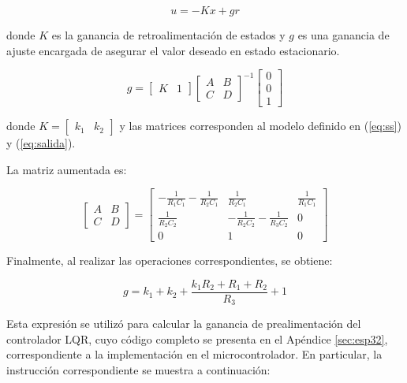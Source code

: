 \documentclass[12pt,letterpaper,twoside]{article}
\begin{document}
\begin{equation}
u = -Kx + g r
\end{equation}

donde \(K\) es la ganancia de retroalimentación de estados y \(g\) es una ganancia de ajuste encargada de asegurar el valor deseado en estado estacionario.

\begin{equation}
g =
\begin{bmatrix}
K & 1
\end{bmatrix}
\begin{bmatrix}
A & B \\
C & D
\end{bmatrix}^{-1}
\begin{bmatrix}
0 \\
0 \\
1
\end{bmatrix}
\end{equation}

donde \(K = \begin{bmatrix} k_1 & k_2 \end{bmatrix}\) y las matrices corresponden al modelo definido en (\ref{eq:ss}) y (\ref{eq:salida}).

La matriz aumentada es:

\begin{equation}
\begin{bmatrix}
A & B \\
C & D
\end{bmatrix}
=
\begin{bmatrix}
-\frac{1}{R_1 C_1} - \frac{1}{R_2 C_1} & \frac{1}{R_2 C_1} & \frac{1}{R_1 C_1} \\
\frac{1}{R_2 C_2} & -\frac{1}{R_2 C_2} - \frac{1}{R_3 C_2} & 0 \\
0 & 1 & 0
\end{bmatrix}
\end{equation}

Finalmente, al realizar las operaciones correspondientes, se obtiene:

\begin{equation}
g = k_1 + k_2 + \frac{k_1 R_2 + R_1 + R_2}{R_3} +1
\end{equation}

Esta expresión se utilizó para calcular la ganancia de prealimentación del controlador LQR, cuyo código completo se presenta en el Apéndice \ref{sec:esp32}, correspondiente a la implementación en el microcontrolador. En particular, la instrucción correspondiente se muestra a continuación:
\end{document}

